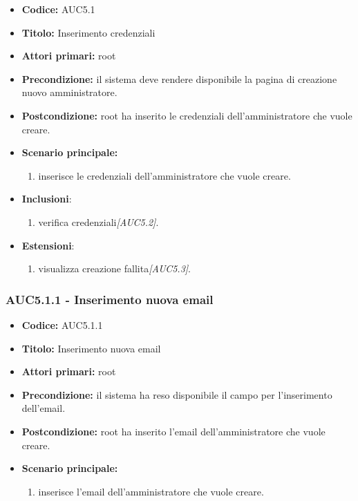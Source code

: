 \documentclass[casi-duso]{subfiles}
\begin{document}
\begin{itemize}
  \item \textbf{Codice:} AUC5.1
  \item \textbf{Titolo:} Inserimento credenziali
  \item \textbf{Attori primari:} root
  \item \textbf{Precondizione:} il sistema deve rendere disponibile la pagina di creazione nuovo amministratore.
  \item \textbf{Postcondizione:} root ha inserito le credenziali dell'amministratore che vuole creare.
  \item \textbf{Scenario principale:}
  \begin{enumerate}
    \item {} inserisce le credenziali dell'amministratore che vuole creare.
  \end{enumerate}
  \item \textbf{Inclusioni}:
  \begin{enumerate}
    \item verifica credenziali\emph{[AUC5.2]}.
  \end{enumerate}
  \item \textbf{Estensioni}:
  \begin{enumerate}
    \item  visualizza creazione fallita\emph{[AUC5.3]}.
  \end{enumerate}
\end{itemize}

\subsubsection{AUC5.1.1 - Inserimento nuova email}%
\label{subsub:AUC5.1.1}
\begin{itemize}
  \item \textbf{Codice:} AUC5.1.1
  \item \textbf{Titolo:} Inserimento nuova email
  \item \textbf{Attori primari:} root
  \item \textbf{Precondizione:} il sistema ha reso disponibile il campo per l'inserimento dell'email.
  \item \textbf{Postcondizione:} root ha inserito l'email dell'amministratore che vuole creare.
  \item \textbf{Scenario principale:}
  \begin{enumerate}
    \item {} inserisce l'email dell'amministratore che vuole creare.
  \end{enumerate}
\end{itemize}
\end{document}
